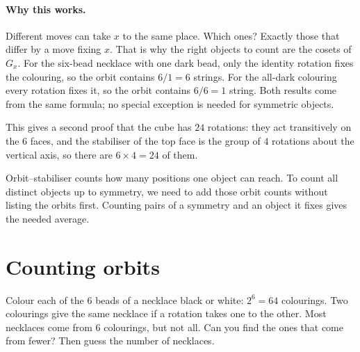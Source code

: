 \paragraph{Why this works.}
Different moves can take $x$ to the same place. Which ones? Exactly those that differ by a move fixing $x$. That is why the right objects to count are the cosets of $G_x$. For the six-bead necklace with one dark bead, only the identity rotation fixes the colouring, so the orbit contains $6/1=6$ strings. For the all-dark colouring every rotation fixes it, so the orbit contains $6/6=1$ string. Both results come from the same formula; no special exception is needed for symmetric objects.

This gives a second proof that the cube has $24$ rotations: they act transitively on the $6$ faces, and the stabiliser of the top face is the group of $4$ rotations about the vertical axis, so there are $6\times4=24$ of them.

Orbit--stabiliser counts how many positions one object can reach. To count all distinct objects up to symmetry, we need to add those orbit counts without listing the orbits first. Counting pairs of a symmetry and an object it fixes gives the needed average.

\section{Counting orbits}

\begin{think}
Colour each of the $6$ beads of a necklace black or white: $2^6=64$ colourings. Two colourings give the same necklace if a rotation takes one to the other. Most necklaces come from $6$ colourings, but not all. Can you find the ones that come from fewer? Then guess the number of necklaces.
\end{think}

